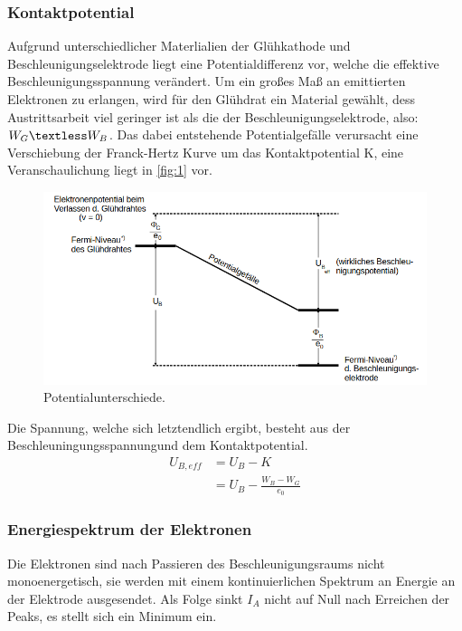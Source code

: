 \subsubsection{Kontaktpotential}
Aufgrund unterschiedlicher Materlialien der Glühkathode und Beschleunigungselektrode 
liegt eine Potentialdifferenz vor, welche die effektive Beschleunigungsspannung 
verändert. Um ein großes Maß an emittierten Elektronen zu erlangen, wird für 
den Glühdrat ein Material gewählt, dess Austrittsarbeit viel geringer ist als 
die der Beschleunigungselektrode, also: $W_G \textless W_B$. Das dabei 
entstehende Potentialgefälle verursacht eine Verschiebung der Franck-Hertz 
Kurve um das Kontaktpotential K, eine Veranschaulichung liegt in \autoref{fig:1}
vor.
\begin{figure}[H]
    \centering
        \centering
        \includegraphics[width=\textwidth]{Bilder/kp.png}
        \caption{Potentialunterschiede. \cite{anleitung5}}
    \hfill
    \label{fig:1}
\end{figure}
\noindent Die Spannung, welche sich letztendlich ergibt, besteht aus der
Beschleuningungsspannungund dem Kontaktpotential.
\begin{align}
    \label{eqn:5}
    U_{B,eff} &= U_B - K \\
              &= U_B - \frac{W_B-W_G}{e_0}
\end{align}

\subsubsection{Energiespektrum der Elektronen}
Die Elektronen sind nach Passieren des Beschleunigungsraums nicht monoenergetisch,
sie werden mit einem kontinuierlichen Spektrum an Energie an der Elektrode 
ausgesendet. Als Folge sinkt $I_A$ nicht auf Null nach Erreichen der Peaks, 
es stellt sich ein Minimum ein.

